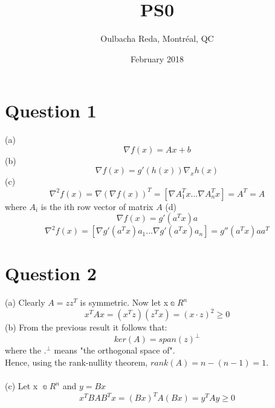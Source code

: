 \documentclass{article}
\title{PS0}
\author{Oulbacha Reda, Montréal, QC}
\date{February 2018}
\begin{document}
\maketitle

\section*{Question 1}
(a) $$\nabla f(x) = Ax + b$$ \n
(b) $$\nabla f(x) = g'(h(x)) \nabla_x h(x)$$ \n  
(c) $$\nabla^2 f(x) = \nabla(\nabla f(x))^T = [\nabla A_1^Tx ... \nabla A_n^Tx ]  = A^T = A $$ where $A_i$ is the ith row vector of matrix $A$ \newline
(d) $$\nabla f(x) = g'(a^Tx)a$$ \n
$$ \nabla^2 f(x) = [ \nabla g'(a^Tx)a_1 ... \nabla g'(a^Tx)a_n ] = g''(a^Tx)aa^T $$

\section*{Question 2}
(a) Clearly $A = zz^T$ is symmetric. Now let x\in$\Bbba R^n$ \n
$$x^TAx = (x^Tz)(z^Tx) = (x \cdot z)^2 \ge  0$$ \n
(b) From the previous result it follows that:
$$ker(A) = span(z)^\bot$$ where the $.^\bot$ means "the orthogonal space of". \n
\\ Hence, using the rank-nullity theorem, $rank(A) = n - (n-1) = 1 $.
\\
\\
(c) Let x \in $\Bbba R^n$ \n and $y=Bx$ 
$$x^TBAB^Tx = (Bx)^TA(Bx) = y^TAy\ge0$$
\end{document}
